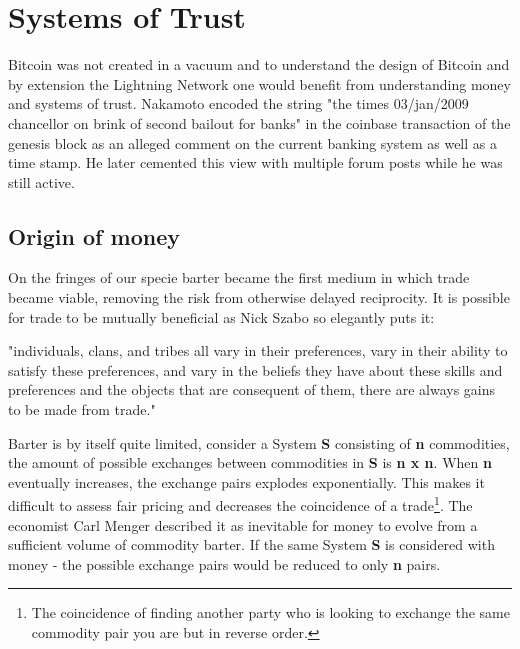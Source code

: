 \chapter{Systems of Trust}
\label{sec:macroeconomics}

Bitcoin was not created in a vacuum and to understand the design of Bitcoin and by extension the Lightning Network one would
benefit from understanding money and systems of trust. Nakamoto encoded the string "the times 03/jan/2009 chancellor on brink of second bailout for banks"\cite{repository:bitcoin:sourceforge}\cite{bitcoin:genesis:coinbase} in the coinbase transaction of the genesis block as an alleged comment on the current banking system as well as a time stamp. He later cemented this view with multiple forum posts while he was still active\cite{nakamoto:post:deflation}\cite{nakamoto:govern:print}.

\section{Origin of money}

On the fringes of our specie barter became the first medium in which trade became viable, removing the risk from otherwise delayed reciprocity. It is possible for trade to be mutually beneficial as Nick Szabo so elegantly puts it:

\begin{displayquote}

"individuals, clans, and tribes all vary in their preferences, vary in their ability to satisfy these preferences, and vary in the beliefs they have about these skills and preferences and the objects that are consequent of them, there are always gains to be made from trade."\cite{szabo:shelling:out}

\end{displayquote}

Barter is by itself quite limited, consider a System \textbf{S}
consisting of \textbf{n} commodities, the amount of possible exchanges between commodities in \textbf{S} is \textbf{n x n}. When \textbf{n} eventually increases, the exchange pairs explodes exponentially. This makes it difficult to assess fair pricing and decreases the coincidence of a trade\footnote{The coincidence of finding another party who is looking to exchange the same commodity pair you are but in reverse order.}. The economist Carl Menger described it as inevitable for money to evolve from a sufficient volume of commodity barter\cite{menger:origins:money}. If the same System \textbf{S} is considered with money - the possible exchange pairs would be reduced to only \textbf{n} pairs. 

